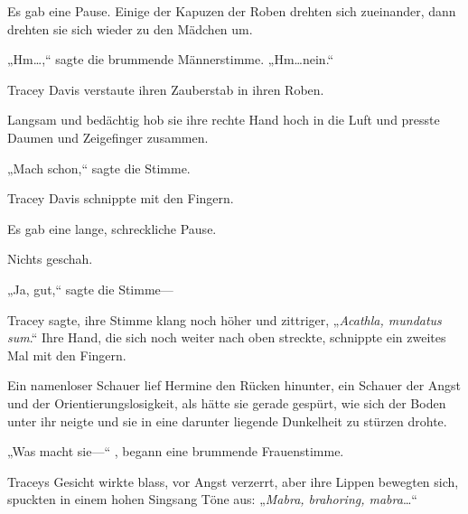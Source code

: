 Es gab eine Pause. Einige der Kapuzen der Roben drehten sich zueinander, dann drehten sie sich wieder zu den Mädchen um.

„Hm…,“ sagte die brummende Männerstimme. „Hm…nein.“

Tracey Davis verstaute ihren Zauberstab in ihren Roben.

Langsam und bedächtig hob sie ihre rechte Hand hoch in die Luft und presste Daumen und Zeigefinger zusammen.

„Mach schon,“ sagte die Stimme.

Tracey Davis schnippte mit den Fingern.

Es gab eine lange, schreckliche Pause.

Nichts geschah.

„Ja, gut,“ sagte die Stimme—

Tracey sagte, ihre Stimme klang noch höher und zittriger, „\emph{Acathla, mundatus sum}.“ Ihre Hand, die sich noch weiter nach oben streckte, schnippte ein zweites Mal mit den Fingern.

Ein namenloser Schauer lief Hermine den Rücken hinunter, ein Schauer der Angst und der Orientierungslosigkeit, als hätte sie gerade gespürt, wie sich der Boden unter ihr neigte und sie in eine darunter liegende Dunkelheit zu stürzen drohte.

„Was macht sie—“ , begann eine brummende Frauenstimme.

Traceys Gesicht wirkte blass, vor Angst verzerrt, aber ihre Lippen bewegten sich, spuckten in einem hohen Singsang Töne aus: „\emph{Mabra, brahoring, mabra}…“

